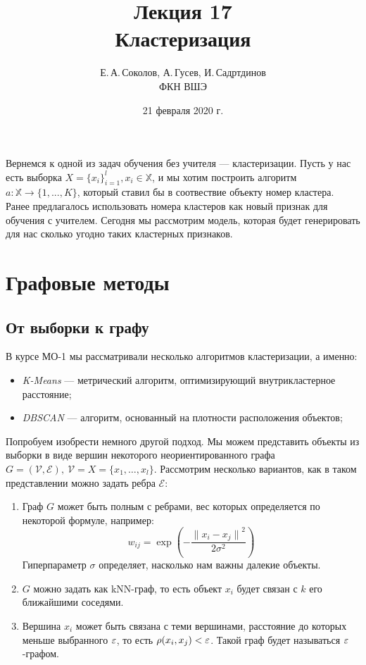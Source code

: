 \documentclass[12pt,fleqn]{article}
\title{Лекция 17\\Кластеризация}
\author{Е.\,А.\,Соколов, А.\,Гусев, И.\,Садртдинов\\ФКН ВШЭ}
\date{21 февраля 2020 г.}
\begin{document}
\maketitle

Вернемся к одной из задач обучения без учителя --- кластеризации. Пусть у нас есть выборка $ X = \{x_i\}_{i=1}^l, x_i \in \mathbb{X} $, и мы хотим построить алгоритм $ a: \mathbb{X} \rightarrow \{1, ..., K\} $, который  ставил бы в соотвествие объекту номер кластера. Ранее предлагалось использовать номера кластеров как новый признак для обучения с учителем. Сегодня мы рассмотрим модель, которая будет генерировать для нас сколько угодно таких кластерных признаков.

\section{Графовые методы}

\subsection{От выборки к графу}

В курсе МО-1 мы рассматривали несколько алгоритмов кластеризации, а именно:

\begin{itemize}
    \item \textit{K-Means} --- метрический алгоритм, оптимизирующий внутрикластерное расстояние;
    \item \textit{DBSCAN} --- алгоритм, основанный на плотности расположения объектов;
\end{itemize}

Попробуем изобрести немного другой подход. 
Мы можем представить объекты из выборки в виде вершин некоторого неориентированного графа  
$G = (\mathcal{V}, \mathcal{E}),\ \mathcal{V}=X=\{x_1, \dots, x_l\}$.
Рассмотрим несколько вариантов, как в таком представлении можно задать ребра $\mathcal{E}$:

\begin{enumerate}
   \item Граф $G$ может быть полным с ребрами, вес которых определяется по некоторой формуле, например:
   \[
   w_{ij} = \exp\left(-\frac{{\|x_i-x_j\|}^2}{2\sigma^2}\right)\]
   Гиперпараметр $\sigma$ определяет, насколько нам важны далекие объекты.
   \item $G$ можно задать как kNN-граф, то есть объект $x_i$ будет связан с $k$ его ближайшими соседями.
   \item Вершина $x_i$ может быть связана с теми вершинами, расстояние до которых меньше выбранного $\varepsilon$, то есть $\rho(x_i, x_j) < \varepsilon$. Такой граф будет называться $\varepsilon$-графом.
\end{enumerate}
\end{document}
